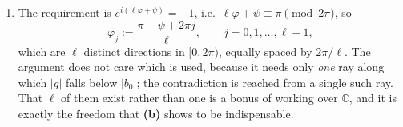 \begin{exercisesolution}
\begin{enumerate}[label=\textbf{(\alph*)}]
    That is the sharpest way to say what the proof actually uses: not that $f$ is smooth, nor
    that it grows, but that the lowest-order correction to $b_0$ has a \emph{phase} that the free
    parameter $\varphi$ can rotate onto $-b_0$. The function $z\overline z$ is the standard
    example of a perturbation with no phase to rotate.
  \item The requirement is $e^{i(\ell\varphi+\psi)} = -1$, i.e.\
    $\ell\varphi + \psi \equiv \pi \pmod{2\pi}$, so
    \[\varphi_j := \frac{\pi - \psi + 2\pi j}{\ell}, \qquad j = 0,1,\ldots,\ell-1,\]
    which are $\ell$ distinct directions in $[0,2\pi)$, equally spaced by $2\pi/\ell$. The
    argument does not care which is used, because it needs only \emph{one} ray along which
    $\lvert g\rvert$ falls below $\lvert b_0\rvert$; the contradiction is reached from a single
    such ray. That $\ell$ of them exist rather than one is a bonus of working over $\mathbb{C}$,
    and it is exactly the freedom that \textbf{(b)} shows to be indispensable.
\end{enumerate}
\end{exercisesolution}

